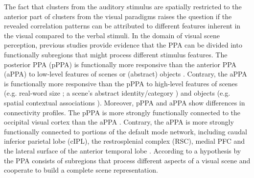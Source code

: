\documentclass[english]{article}
\begin{document}

The fact that clusters from the auditory stimulus are spatially restricted to
the anterior part of clusters from the visual paradigms raises the question if
the revealed correlation patterns can be attributed to different features
inherent in the visual compared to the verbal stimuli.
In the domain of visual scene perception, previous studies provide evidence that
the PPA can be divided into functionally subregions that might process different
stimulus features.
The posterior PPA (pPPA) is functionally more responsive than the anterior PPA
(aPPA) to low-level features of scenes or (abstract) objects
\citep{baldassano2013differential, nasr2014thinking,
rajimehr2011parahippocampal}.
Contrary, the aPPA is functionally more responsive than the pPPA to high-level
features of scenes (e.g. real-word size \citep{park2015parametric}; a scene's
abstract identity/category \citep{marchette2015outside, watson2016patterns}) and
objects (e.g. spatial contextual associations \citep{aminoff2007parahippocampal,
aminoff2013role}).
Moreover, pPPA and aPPA show differences in connectivity profiles.
The pPPA is more strongly functionally connected to the occipital visual cortex
than the aPPA \citep{baldassano2013differential, baldassano2016two}.
Contrary, the aPPA is more strongly functionally connected to portions of the
default mode network, including caudal inferior parietal lobe (cIPL), the
restrosplenial complex (RSC), medial PFC and the lateral surface of the anterior
temporal lobe \citep{baldassano2013differential, baldassano2016two}.
According to a hypothesis by \citep{baldassano2013differential} the PPA consists
of subregions that process different aspects of a visual scene and cooperate to
build a complete scene representation.
\end{document}
